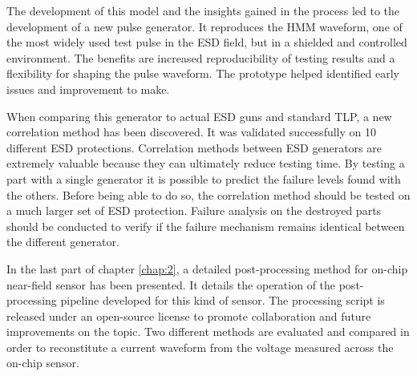 The development of this model and the insights gained in the process led to the development of a new pulse generator.
It reproduces the HMM waveform, one of the most widely used test pulse in the ESD field, but in a shielded and controlled environment.
The benefits are increased reproducibility of testing results and a flexibility for shaping the pulse waveform.
The prototype helped identified early issues and improvement to make.

When comparing this generator to actual ESD guns and standard TLP, a new correlation method has been discovered.
It was validated successfully on 10 different ESD protections.
Correlation methods between ESD generators are extremely valuable because they can ultimately reduce testing time.
By testing a part with a single generator it is possible to predict the failure levels found with the others.
Before being able to do so, the correlation method should be tested on a much larger set of ESD protection.
Failure analysis on the destroyed parts should be conducted to verify if the failure mechanism remains identical between the different generator.

In the last part of chapter \ref{chap:2}, a detailed post-processing method for on-chip near-field sensor has been presented.
It details the operation of the post-processing pipeline developed for this kind of sensor.
The processing script is released \cite{nfs-repository} under an open-source license to promote collaboration and future improvements on the topic.
Two different methods are evaluated and compared in order to reconstitute a current waveform from the voltage measured across the on-chip sensor.

